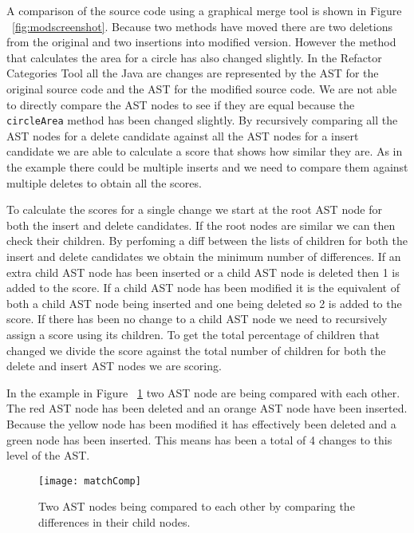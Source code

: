 A comparison of the source code using a graphical merge tool is shown in Figure ~\ref{fig:modscreenshot}.  Because two methods have moved there are two deletions from the original and two insertions into modified version.  However the method that calculates the area for a circle has also changed slightly. In the Refactor Categories Tool all the Java are changes are represented by the AST for the original source code and the AST for the modified source code. We are not able to directly compare the AST nodes to see if they are equal because the \lstinline{circleArea} method has been changed slightly. By recursively comparing all the AST nodes for a delete candidate against all the AST nodes for a insert candidate we are able to calculate a score that shows how similar they are.  As in the example there could be multiple inserts and we need to compare them against multiple deletes to obtain all the scores.

To calculate the scores for a single change we start at the root AST node for both the insert and delete candidates.  If the root nodes are similar we can then check their children. By perfoming a diff between the lists of children for both the insert and delete candidates we obtain the minimum number of differences.  If an extra child AST node has been inserted or a child AST node is deleted then 1 is added to the score. If a child AST node has been modified it is the equivalent of both a child AST node being inserted and one being deleted so 2 is added to the score. If there has been no change to a child AST node we need to recursively assign a score using its children. To get the total percentage of children that changed we divide the score against the total number of children for both the delete and insert AST nodes we are scoring.

In the example in Figure ~\ref{fig:matchComp} two AST node are being compared with each other. The red AST node has been deleted and an orange AST node have been inserted. Because the yellow node has been modified it has effectively been deleted and a green node has been inserted. This means has been a total of 4 changes to this level of the AST. 

\begin{figure}[!t]
 \begin{center}
 \texttt{[image: matchComp]}
 \end{center}
 \caption{Two AST nodes being compared to each other by comparing the differences in their child nodes.}
 \label{fig:matchComp}
\end{figure}


